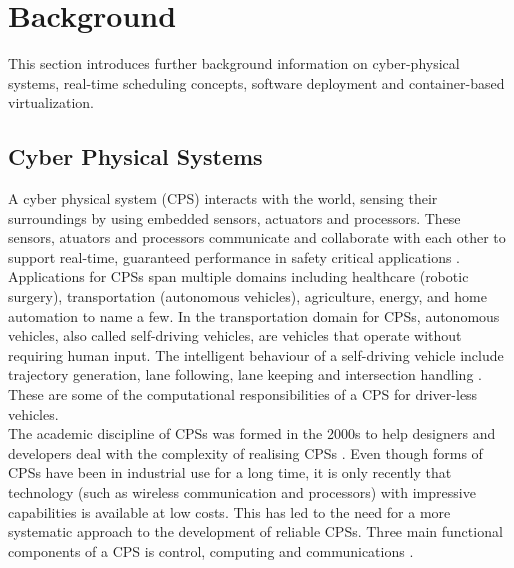 \iffalse  \fi
\chapter{Background} \label{sect:background} 
This section introduces further background information on cyber-physical systems, real-time scheduling concepts, software deployment and container-based virtualization.
\section{Cyber Physical Systems}

A cyber physical system (CPS) interacts with the world, sensing their surroundings by using embedded sensors, actuators and processors. These sensors, atuators and processors communicate and collaborate with each other to support real-time, guaranteed performance in safety critical applications \cite{sidcyber}. Applications for CPSs span multiple domains including healthcare (robotic surgery), transportation (autonomous vehicles), agriculture, energy, and home automation to name a few. In the transportation domain for CPSs, autonomous vehicles, also called self-driving vehicles, are vehicles that operate without requiring human input. The intelligent behaviour of a self-driving vehicle include trajectory generation, lane following, lane keeping and intersection handling \cite{sidcyber}. These are some of the computational responsibilities of a CPS for driver-less vehicles.\\ 

The academic discipline of CPSs was formed in the 2000s \cite{alur} to help designers and developers deal with the complexity of realising CPSs \cite{gonz}. Even though forms of CPSs have been in industrial use for a long time, it is only recently that technology (such as wireless communication and processors) with impressive capabilities is available at low costs. This has led to the need for a more systematic approach to the development of reliable CPSs. Three main functional components of a CPS is control, computing and communications \cite{alur}.\\

